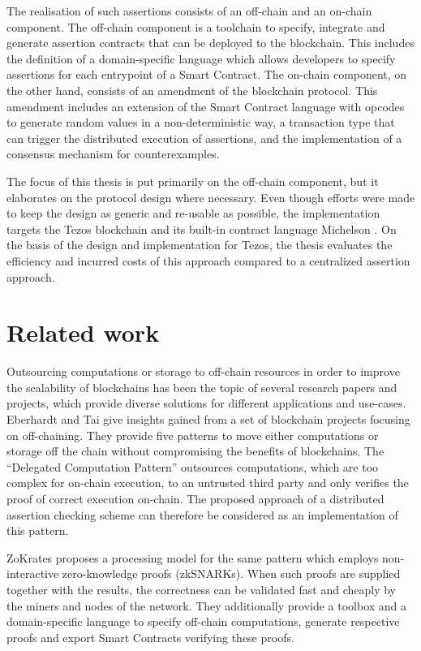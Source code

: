 The realisation of such assertions consists of an off-chain and an on-chain component. The off-chain component is a toolchain to specify, integrate and generate assertion contracts that can be deployed to the blockchain. This includes the definition of a domain-specific language which allows developers to specify assertions for each entrypoint of a Smart Contract. The on-chain component, on the other hand, consists of an amendment of the blockchain protocol. This amendment includes an extension of the Smart Contract language with opcodes to generate random values in a non-deterministic way, a transaction type that can trigger the distributed execution of assertions, and the implementation of a consensus mechanism for counterexamples. 

The focus of this thesis is put primarily on the off-chain component, but it elaborates on the protocol design where necessary.  Even though efforts were made to keep the design as generic and re-usable as possible, the implementation targets the Tezos \cite{goodman_tezos_2014} blockchain and its built-in contract language Michelson \cite{michelson_ref}. On the basis of the design and implementation for Tezos, the thesis evaluates the efficiency and incurred costs of this approach compared to a centralized assertion approach.

\section{Related work}
Outsourcing computations or storage to off-chain resources in order to improve the scalability of blockchains has been the topic of several research papers and projects, which provide diverse solutions for different applications and use-cases. Eberhardt and Tai \cite{eberhardt_offonchain} give insights gained from a set of blockchain projects focusing on off-chaining. They provide five patterns to move either computations or storage off the chain without compromising the benefits of blockchains. The ``Delegated Computation Pattern'' outsources computations, which are too complex for on-chain execution, to an untrusted third party and only verifies the proof of correct execution on-chain. The proposed approach of a distributed assertion checking scheme can therefore be considered as an implementation of this pattern.

ZoKrates \cite{eberhardt_zokrates_2018} proposes a processing model for the same pattern which employs non-interactive zero-knowledge proofs (zkSNARKs). When such proofs are supplied together with the results, the correctness can be validated fast and cheaply by the miners and nodes of the network. They additionally provide a toolbox and a domain-specific language to specify off-chain computations, generate respective proofs and export Smart Contracts verifying these proofs.

